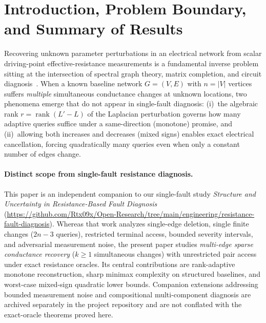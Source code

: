 \documentclass[11pt,letterpaper]{article}
\begin{document}
\section{Introduction, Problem Boundary, and Summary of Results}
Recovering unknown parameter perturbations in an electrical network from scalar driving-point effective-resistance measurements is a fundamental inverse problem sitting at the intersection of spectral graph theory, matrix completion, and circuit diagnosis~\cite{DS,GBS,FB,WBBN}. When a known baseline network $G=(V,E)$ with $n=|V|$ vertices suffers \emph{multiple} simultaneous conductance changes at unknown locations, two phenomena emerge that do not appear in single-fault diagnosis: (i)~the algebraic rank $r = \operatorname{rank}(L'-L)$ of the Laplacian perturbation governs how many adaptive queries suffice under a same-direction (monotone) promise, and (ii)~allowing both increases and decreases (mixed signs) enables exact electrical cancellation, forcing quadratically many queries even when only a constant number of edges change.

\paragraph{Distinct scope from single-fault resistance diagnosis.}
This paper is an independent companion to our single-fault study \emph{Structure and Uncertainty in Resistance-Based Fault Diagnosis} (\url{https://github.com/Rtx09x/Open-Research/tree/main/engineering/resistance-fault-diagnosis}). Whereas that work analyzes single-edge deletion, single finite changes ($2n-3$ queries), restricted terminal access, bounded severity intervals, and adversarial measurement noise, the present paper studies \emph{multi-edge sparse conductance recovery} ($k \ge 1$ simultaneous changes) with unrestricted pair access under exact resistance oracles. Its central contributions are rank-adaptive monotone reconstruction, sharp minimax complexity on structured baselines, and worst-case mixed-sign quadratic lower bounds. Companion extensions addressing bounded measurement noise and compositional multi-component diagnosis are archived separately in the project repository and are not conflated with the exact-oracle theorems proved here.
\end{document}
